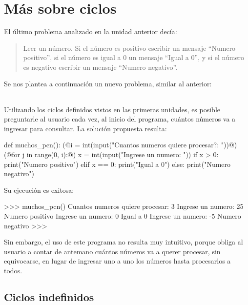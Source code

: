 \chapter{Más sobre ciclos}

El último problema analizado en la unidad anterior decía:

\begin{quote}
Leer un número. Si el número es positivo escribir un mensaje
``Numero positivo'', si el número es igual a 0 un mensaje ``Igual a
0'', y si el número es negativo escribir un mensaje ``Numero
negativo''.
\end{quote}

Se nos plantea a continuación un nuevo problema, similar al anterior:

 \\

Utilizando los ciclos definidos vistos en las primeras unidades, es posible
preguntarle al usuario cada vez, al inicio del programa, cuántos números va a
ingresar para consultar. La solución propuesta resulta:

\begin{codigo-python-sn}
def muchos_pcn():
    (@i = int(input("Cuantos numeros quiere procesar?: "))@)
    (@for j in range(0, i):@)
        x = int(input("Ingrese un numero: "))
        if x > 0:
            print("Numero positivo")
        elif x == 0:
            print("Igual a 0")
        else:
            print("Numero negativo")
\end{codigo-python-sn}

Su ejecución es exitosa:

\begin{codigo-python-sn}
>>> muchos_pcn()
Cuantos numeros quiere procesar: 3
Ingrese un numero: 25
Numero positivo
Ingrese un numero: 0
Igual a 0
Ingrese un numero: -5
Numero negativo
>>>
\end{codigo-python-sn}

Sin embargo, el uso de este programa no resulta muy intuitivo, porque
obliga al usuario a contar de antemano cuántos números va a querer procesar, sin
equivocarse, en lugar de ingresar uno a uno los números hasta procesarlos a
todos.

\section{Ciclos indefinidos}

